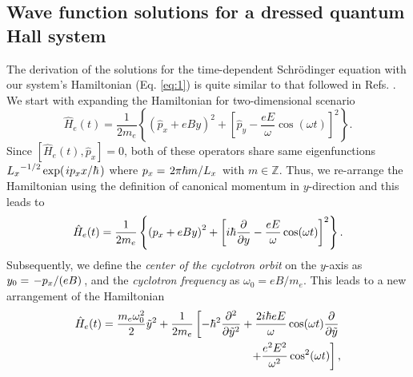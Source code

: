 \documentclass[
 reprint,
 amsmath,amssymb,
 aps,
 prb,
]{revtex4-2}
\begin{document}
\begin{appendix}

\section{\label{appendix_a} Wave function solutions for a dressed quantum Hall system}

The derivation of the solutions for the time-dependent Schrödinger equation with our system's Hamiltonian (Eq. \ref{eq:1}) is quite similar to that followed in Refs. \cite{husimi53,dini16}. We start with expanding the Hamiltonian for two-dimensional scenario
\begin{equation} \label{eq:a1}
  \hat{H}_e(t) = \frac{1}{2m_e}
  \left\{
    \left(\hat{p}_x + eBy \right)^2 +
    \left[
      \hat{p}_y - \frac{eE}{\omega}\cos(\omega t)
    \right]^2
  \right\}.
\end{equation}
Since $\left[\hat{H}_e(t),\hat{p}_x \right] =0$, both of these operators share same eigenfunctions
${L_x}^{-1/2}\exp(\flatfrac{ip_x x}{\hbar})$ where $p_x = \flatfrac{2\pi \hbar m}{L_x}$ with $ m \in \mathbb{Z}$.
Thus, we re-arrange the Hamiltonian using the definition of canonical momentum in $y$-direction and this leads to
\begin{equation} \label{eq:a2}
    \hat{H}_e(t) = \frac{1}{2m_e}
    \left\{
      \left({p}_x + eBy \right)^2 +
      \left[
        i\hbar \pdv{y}- \frac{eE}{\omega}\cos(\omega t)
      \right]^2
    \right\}.
\end{equation}
Subsequently, we define the \textit{center of the cyclotron orbit} on the $y$-axis as $y_0 = \flatfrac{-p_x}{(eB)}$, and the \textit{cyclotron frequency} as  $\omega_0 = {eB}/{m_e}$. This leads to a new arrangement of the Hamiltonian
\begin{equation} \label{eq:a3}
  \begin{aligned}
    \hat{H}_e(t) =
      \frac{m_e \omega_0^2}{2}\tilde{y}^2 +
      \frac{1}{2m_e} &
      \left[
        -\hbar^2 \pdv[2]{\tilde{y}}  +
        \frac{2i\hbar eE}{\omega} \cos(\omega t) \pdv{\tilde{y}}
        \right.\\
        & \left. \qquad\qquad\quad +
        \frac{e^2E^2}{\omega^2}\cos[2](\omega t)
        \right],
  \end{aligned}
\end{equation}

\end{appendix}
\end{document}
